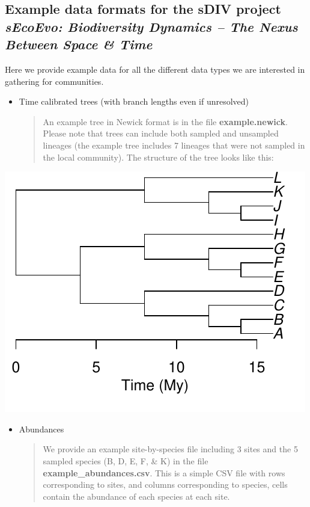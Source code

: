 \documentclass[]{article}
\title{}
\author{}
\date{}
\begin{document}
\subsection{\texorpdfstring{Example data formats for the sDIV project
\emph{sEcoEvo: Biodiversity Dynamics -- The Nexus Between Space \&
Time}}{Example data formats for the sDIV project sEcoEvo: Biodiversity Dynamics -- The Nexus Between Space \& Time}}\label{example-data-formats-for-the-sdiv-project-secoevo-biodiversity-dynamics-the-nexus-between-space-time}

Here we provide example data for all the different data types we are
interested in gathering for communities.

\begin{itemize}
\item
  Time calibrated trees (with branch lengths even if unresolved)

  \begin{quote}
  An example tree in Newick format is in the file
  \textbf{example.newick}. Please note that trees can include both
  sampled and unsampled lineages (the example tree includes 7 lineages
  that were not sampled in the local community). The structure of the
  tree looks like this:
  \end{quote}
\end{itemize}

\begin{center}
  \includegraphics{example_tree.pdf}
\end{center}


\begin{itemize}
\item
  Abundances

  \begin{quote}
  We provide an example site-by-species file including 3 sites and the 5
  sampled species (B, D, E, F, \& K) in the file
  \textbf{example\_abundances.csv}. This is a simple CSV file with rows
  corresponding to sites, and columns corresponding to species, cells
  contain the abundance of each species at each site.
  \end{quote}
\end{itemize}
\end{document}
